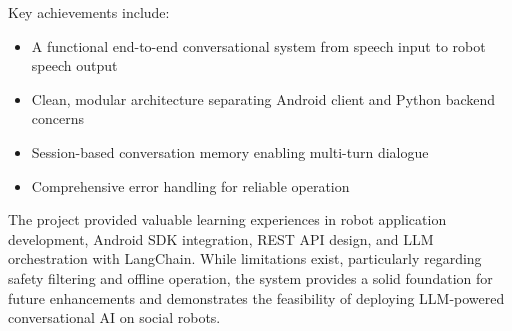 \documentclass[a4paper]{article}
\begin{document}
Key achievements include:
\begin{itemize}[noitemsep]
    \item A functional end-to-end conversational system from speech input to robot speech output
    \item Clean, modular architecture separating Android client and Python backend concerns
    \item Session-based conversation memory enabling multi-turn dialogue
    \item Comprehensive error handling for reliable operation
\end{itemize}

The project provided valuable learning experiences in robot application development, Android SDK integration, REST API design, and LLM orchestration with LangChain. While limitations exist, particularly regarding safety filtering and offline operation, the system provides a solid foundation for future enhancements and demonstrates the feasibility of deploying LLM-powered conversational AI on social robots.


\nocite{*}

\newpage
\end{document}
